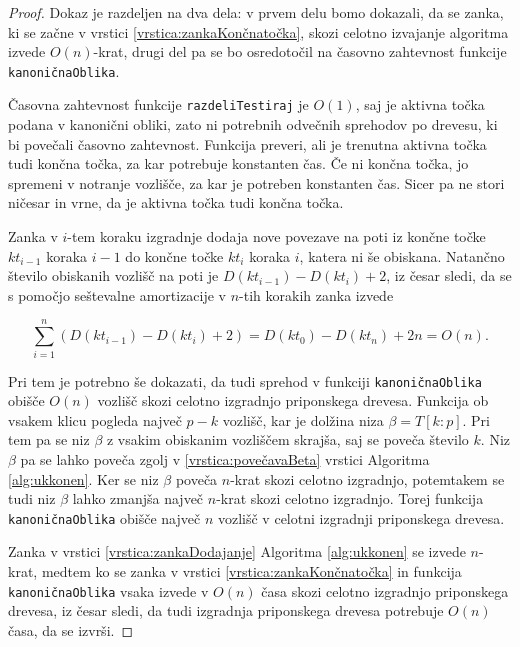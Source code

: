 \begin{proof}

Dokaz je razdeljen na dva dela: v prvem delu bomo dokazali, da se zanka, ki se začne v vrstici \ref{vrstica:zankaKončnatočka}, skozi celotno izvajanje algoritma izvede $O(n)$-krat, drugi del pa se bo osredotočil na časovno zahtevnost funkcije \texttt{kanoničnaOblika}. 

Časovna zahtevnost funkcije \texttt{razdeliTestiraj} je $O(1)$, saj je aktivna točka podana v kanonični obliki, zato ni potrebnih odvečnih sprehodov po drevesu, ki bi povečali časovno zahtevnost. Funkcija preveri, ali je trenutna aktivna točka tudi končna točka, za kar potrebuje konstanten čas. Če ni končna točka, jo spremeni v notranje vozlišče, za kar je potreben konstanten čas. Sicer pa ne stori ničesar in vrne, da je aktivna točka tudi končna točka.

Zanka v $i$-tem koraku izgradnje dodaja nove povezave na poti iz končne točke $kt_{i-1}$ koraka $i-1$ do končne točke $kt_i$ koraka $i$, katera ni še obiskana. Natančno število obiskanih vozlišč na poti je $D(kt_{i-1})-D(kt_i)+2$, iz česar sledi, da se s pomočjo seštevalne amortizacije v $n$-tih korakih zanka izvede


$$
    \sum_{i=1}^n \left(D(kt_{i-1})-D(kt_i)+2\right)=D(kt_0)-D(kt_n)+2n=O(n).
$$

Pri tem je potrebno še dokazati, da tudi sprehod v funkciji \texttt{kanoničnaOblika} obišče $O(n)$ vozlišč skozi celotno izgradnjo priponskega drevesa. Funkcija ob vsakem klicu pogleda največ $p-k$ vozlišč, kar je dolžina niza $\beta=T[k:p]$. Pri tem pa se niz $\beta$ z vsakim obiskanim vozliščem skrajša, saj se poveča število $k$. Niz $\beta$ pa se lahko poveča zgolj v \ref{vrstica:povečavaBeta} vrstici Algoritma \ref{alg:ukkonen}. Ker se niz $\beta$ poveča $n$-krat skozi celotno izgradnjo, potemtakem se tudi niz $\beta$ lahko zmanjša največ $n$-krat skozi celotno izgradnjo. Torej funkcija \texttt{kanoničnaOblika} obišče največ $n$ vozlišč v celotni izgradnji priponskega drevesa.


Zanka v vrstici \ref{vrstica:zankaDodajanje} Algoritma \ref{alg:ukkonen} se izvede $n$-krat, medtem ko se zanka v vrstici \ref{vrstica:zankaKončnatočka} in funkcija \texttt{kanoničnaOblika} vsaka izvede v $O(n)$ časa skozi celotno izgradnjo priponskega drevesa, iz česar sledi, da tudi izgradnja priponskega drevesa potrebuje $O(n)$ časa, da se izvrši.
  
\end{proof}

